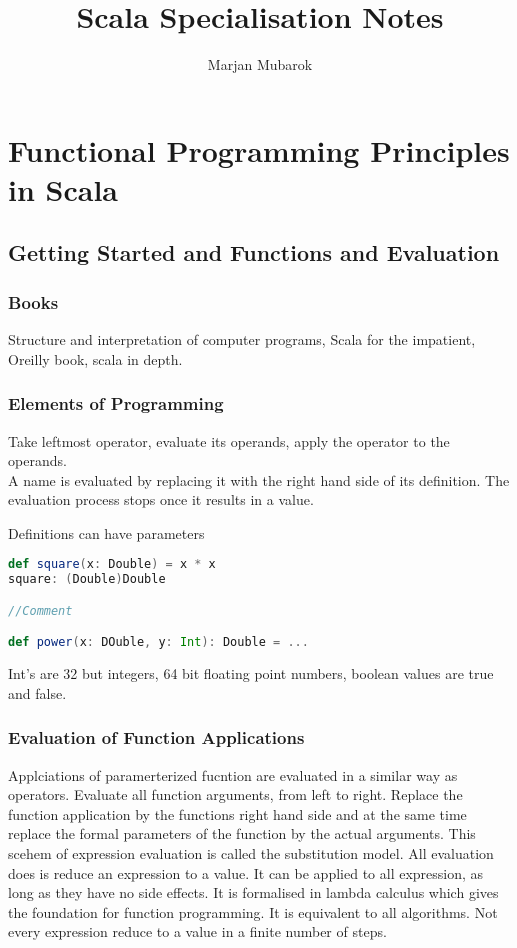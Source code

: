 \documentclass[10pt, a4paper]{report}
\title{Scala Specialisation Notes}
\author{Marjan Mubarok}
\date{}
\begin{document}
\maketitle
\tableofcontents
\part{Functional Programming Principles in Scala}
\chapter{Getting Started and Functions and Evaluation}
\section{Books}
Structure and interpretation of computer programs, Scala for the impatient, Oreilly book, scala in depth.

\section{Elements of Programming}

Take leftmost operator, evaluate its operands, apply the operator to the operands. \\ A name is evaluated by replacing it with the right hand side of its definition. The evaluation process stops once it results in a value. 

Definitions can have parameters

\begin{lstlisting}[language=scala]
def square(x: Double) = x * x
square: (Double)Double

//Comment

def power(x: DOuble, y: Int): Double = ...

\end{lstlisting}

Int's are 32 but integers, 64 bit floating point numbers, boolean values are true and false.

\section{Evaluation of Function Applications}

Applciations of paramerterized fucntion are evaluated in a similar way as operators. Evaluate all function arguments, from left to right. Replace the function application by the functions right hand side and at the same time replace the formal parameters of the function by the actual arguments. This scehem of expression evaluation is called the substitution model. All evaluation does is reduce an expression to a value. It can be applied to all expression, as long as they have no side effects. It is formalised in lambda calculus which gives the foundation for function programming. It is equivalent to all algorithms. Not every expression reduce to a value in a finite number of steps. 
\end{document}
